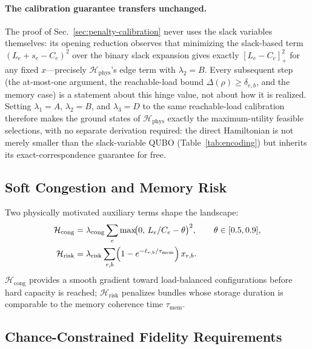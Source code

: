 \documentclass[twocolumn]{article}
\newcommand{\calH}{\mathcal{H}}
\begin{document}
\paragraph{The calibration guarantee transfers unchanged.}  The proof
of Sec.~\ref{sec:penalty-calibration} never uses the slack variables
themselves: its opening reduction observes that minimizing the
slack-based term $(L_e+s_e-C_e)^2$ over the binary slack expansion
gives exactly $[L_e-C_e]_+^2$ for any fixed $x$---precisely
$\calH_{\text{phys}}$'s edge term with $\lambda_2=B$.  Every subsequent
step (the at-most-one argument, the reachable-load bound
$\Delta(\rho)\ge\delta_{e,b}$, and the memory case) is a statement
about this hinge value, not about how it is realized.  Setting
$\lambda_1=A$, $\lambda_2=B$, and $\lambda_3=D$ to the same
reachable-load calibration therefore makes the ground states of
$\calH_{\text{phys}}$ exactly the maximum-utility feasible selections,
with no separate derivation required: the direct Hamiltonian is not
merely smaller than the slack-variable QUBO (Table~\ref{tab:encoding})
but inherits its exact-correspondence guarantee for free.

\subsection{Soft Congestion and Memory Risk}
\label{sec:congestion-risk}

Two physically motivated auxiliary terms shape the landscape:
\begin{align}
  \calH_{\text{cong}} &= \lambda_{\text{cong}} \sum_e
    \max\!\bigl(0,\, L_e/C_e - \theta\bigr)^2, \qquad
    \theta \in [0.5, 0.9],\\
  \calH_{\text{risk}} &= \lambda_{\text{risk}} \sum_{r,b}
    \Bigl(1 - e^{-\ell_{r,b}/\tau_{\text{mem}}}\Bigr)\, x_{r,b}.
\end{align}
$\calH_{\text{cong}}$ provides a smooth gradient toward load-balanced
configurations before hard capacity is reached; $\calH_{\text{risk}}$
penalizes bundles whose storage duration is comparable to the memory
coherence time $\tau_{\text{mem}}$.

\subsection{Chance-Constrained Fidelity Requirements}
\label{sec:chance-form}
\end{document}
